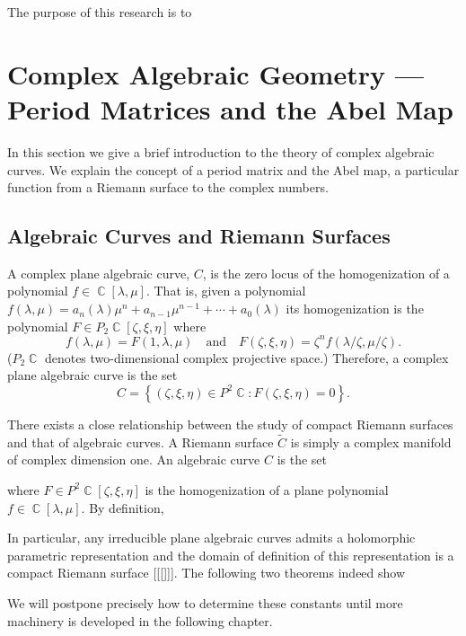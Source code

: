 \documentclass{article}
\DeclareMathOperator{\CC}{\mathbb{C}}
\begin{document}
The purpose of this research is to


\section{Complex Algebraic Geometry --- Period Matrices and the Abel Map}

In this section we give a brief introduction to the theory of complex
algebraic curves. We explain the concept of a period matrix and the Abel
map, a particular function from a Riemann surface to the complex
numbers.

\subsection{Algebraic Curves and Riemann Surfaces}

A complex plane algebraic curve, $C$, is the zero locus of the
homogenization of a polynomial $f \in \CC[\lambda,\mu]$. That is, given
a polynomial $f(\lambda,\mu) = a_n(\lambda) \mu^n + a_{n-1}\mu^{n-1} +
\cdots + a_0(\lambda)$ its homogenization is the polynomial $F \in
P_2\CC[\zeta,\xi,\eta]$ where
\[
f(\lambda,\mu) = F(1,\lambda,\mu)
\quad \text{and} \quad
F(\zeta,\xi,\eta) = \zeta^n f(\lambda/\zeta,\mu/\zeta).
\]
($P_2\CC$ denotes two-dimensional complex projective space.) Therefore,
a complex plane algebraic curve is the set
\[
C = \left\{
(\zeta,\xi,\eta) \in P^2\CC : F(\zeta,\xi,\eta) = 0
\right\}.
\]

There exists a close relationship between the study of compact Riemann
surfaces and that of algebraic curves. A Riemann surface $\tilde{C}$ is
simply a complex manifold of complex dimension one. An algebraic curve
$C$ is the set

where $F \in P^2\CC[\zeta,\xi,\eta]$ is the homogenization of a plane
polynomial $f \in \CC[\lambda,\mu]$. By definition, 

In particular, any irreducible plane algebraic curves admits a
holomorphic parametric representation and the domain of definition of
this representation is a compact Riemann surface [[[]]]. The following
two theorems indeed show

We will postpone precisely how to determine these constants until more
machinery is developed in the following chapter.
\end{document}

